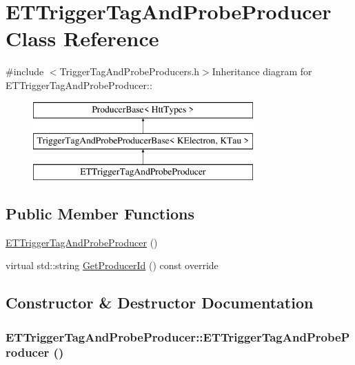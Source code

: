 \hypertarget{classETTriggerTagAndProbeProducer}{
\section{ETTriggerTagAndProbeProducer Class Reference}
\label{classETTriggerTagAndProbeProducer}
}


{\ttfamily \#include $<$TriggerTagAndProbeProducers.h$>$}Inheritance diagram for ETTriggerTagAndProbeProducer::\begin{figure}[H]
\begin{center}
\leavevmode
\includegraphics[height=3cm]{classETTriggerTagAndProbeProducer}
\end{center}
\end{figure}
\subsection*{Public Member Functions}
\begin{DoxyCompactItemize}
\item 
\hyperlink{classETTriggerTagAndProbeProducer_afc02d66f1e4e1514d8599dbf89d4454a}{ETTriggerTagAndProbeProducer} ()
\item 
virtual std::string \hyperlink{classETTriggerTagAndProbeProducer_ae50eab132d0ef04cb8e87160ca919baa}{GetProducerId} () const override
\end{DoxyCompactItemize}


\subsection{Constructor \& Destructor Documentation}
\hypertarget{classETTriggerTagAndProbeProducer_afc02d66f1e4e1514d8599dbf89d4454a}{
\subsubsection[{ETTriggerTagAndProbeProducer}]{\setlength{\rightskip}{0pt plus 5cm}ETTriggerTagAndProbeProducer::ETTriggerTagAndProbeProducer ()}}
\label{classETTriggerTagAndProbeProducer_afc02d66f1e4e1514d8599dbf89d4454a}


